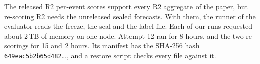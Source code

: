 The released R2 per-event scores support every R2 aggregate of the paper, but re-scoring R2 needs the unreleased sealed forecasts.
With them, the runner of the evaluator reads the freeze, the seal and the label file.
Each of our runs requested about 2\,TB of memory on one node.
Attempt 12 ran for 8 hours, and the two re-scorings for 15 and 2 hours.
Its manifest has the SHA-256 hash \texttt{649eac5b2b65d482}\ldots, and a restore script checks every file against it.
